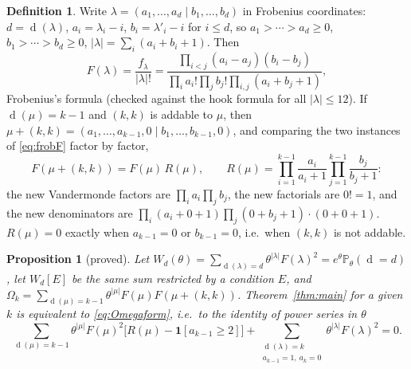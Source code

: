\documentclass[11pt]{article}
\newtheorem{proposition}[theorem]{Proposition}
\theoremstyle{definition}
\newtheorem{definition}[theorem]{Definition}
\theoremstyle{remark}
\newcommand{\Prob}{\mathbb{P}}
\DeclareMathOperator{\Durfee}{d}
\begin{document}
\begin{definition}
Write $\lambda=(a_1,\dots,a_d\mid b_1,\dots,b_d)$ in Frobenius coordinates: $d=\Durfee(\lambda)$, $a_i=\lambda_i-i$, $b_i=\lambda'_i-i$ for $i\le d$, so $a_1>\cdots>a_d\ge0$, $b_1>\cdots>b_d\ge0$, $|\lambda|=\sum_i(a_i+b_i+1)$. Then
\begin{equation}\label{eq:frobF}
F(\lambda)=\frac{f_\lambda}{|\lambda|!}=\frac{\prod_{i<j}(a_i-a_j)(b_i-b_j)}{\prod_ia_i!\prod_jb_j!\prod_{i,j}(a_i+b_j+1)},
\end{equation}
Frobenius's formula (checked against the hook formula for all $|\lambda|\le12$). If $\Durfee(\mu)=k-1$ and $(k,k)$ is addable to $\mu$, then $\mu+(k,k)=(a_1,\dots,a_{k-1},0\mid b_1,\dots,b_{k-1},0)$, and comparing the two instances of \eqref{eq:frobF} factor by factor,
\[
F(\mu+(k,k))=F(\mu)\,R(\mu),\qquad R(\mu)=\prod_{i=1}^{k-1}\frac{a_i}{a_i+1}\prod_{j=1}^{k-1}\frac{b_j}{b_j+1}:
\]
the new Vandermonde factors are $\prod_ia_i\prod_jb_j$, the new factorials are $0!=1$, and the new denominators are $\prod_i(a_i+0+1)\prod_j(0+b_j+1)\cdot(0+0+1)$. $R(\mu)=0$ exactly when $a_{k-1}=0$ or $b_{k-1}=0$, i.e.\ when $(k,k)$ is not addable.
\end{definition}

\begin{proposition}[proved]\label{prop:frobform}
Let $W_d(\theta)=\sum_{\Durfee(\lambda)=d}\theta^{|\lambda|}F(\lambda)^2=e^\theta\Prob_\theta(\Durfee=d)$, let $W_d[E]$ be the same sum restricted by a condition $E$, and $\Omega_k=\sum_{\Durfee(\mu)=k-1}\theta^{|\mu|}F(\mu)F(\mu+(k,k))$. Theorem~\ref{thm:main} for a given $k$ is equivalent to \eqref{eq:Omegaform}, i.e.\ to the identity of power series in $\theta$
\begin{equation}\label{eq:frob}
\sum_{\Durfee(\mu)=k-1}\theta^{|\mu|}F(\mu)^2\bigl[R(\mu)-\mathbf 1[a_{k-1}\ge2]\bigr]
+\sum_{\substack{\Durfee(\lambda)=k\\ a_{k-1}=1,\ a_k=0}}\theta^{|\lambda|}F(\lambda)^2=0 .
\end{equation}
\end{proposition}
\end{document}
